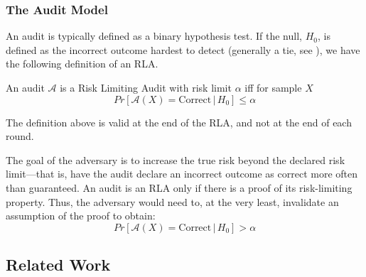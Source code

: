 
\subsubsection{The Audit Model}
An audit is typically defined as a binary hypothesis test. If the null, $H_0$, is defined as the incorrect outcome hardest to detect (generally a tie, see \cite{Bayesian-RLA}), we have the following definition of an RLA. 

\begin{definition}
An audit $\mathcal{A}$ is a Risk Limiting Audit with 
risk limit $\alpha$ iff for sample $X$
$$
Pr[\mathcal{A}(X) 
= \text{Correct} \,|\, H_0]\le \alpha
$$
\end{definition}

The definition above is valid at the end of the RLA, and not at the end of each round. 

The goal of the adversary is to increase the true risk beyond the declared risk limit---that is, have the audit declare an incorrect outcome as correct more often than guaranteed. An audit is an RLA only if there is a proof of its risk-limiting property. Thus, the adversary would need to, at the very least, invalidate an assumption of the proof to obtain:  
$$
Pr[\mathcal{A}(X) 
= \text{Correct} \,|\, H_0] > \alpha
$$

\subsection{Related Work}
\label{sec:related}


